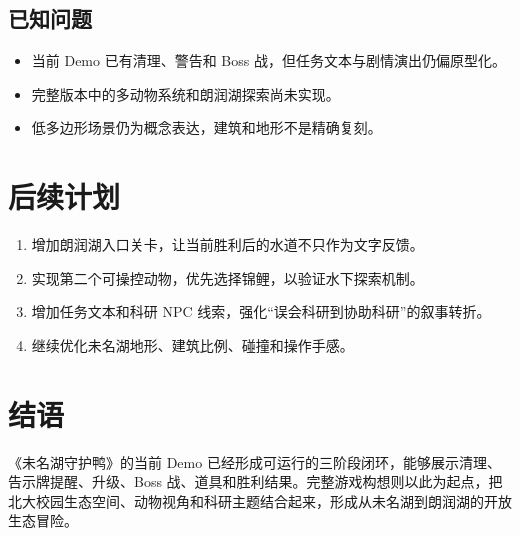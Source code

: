 \documentclass[UTF8,a4paper,12pt]{ctexart}
\begin{document}
\subsection{已知问题}

\begin{itemize}
  \item 当前 Demo 已有清理、警告和 Boss 战，但任务文本与剧情演出仍偏原型化。
  \item 完整版本中的多动物系统和朗润湖探索尚未实现。
  \item 低多边形场景仍为概念表达，建筑和地形不是精确复刻。
\end{itemize}

\section{后续计划}

\begin{enumerate}
  \item 增加朗润湖入口关卡，让当前胜利后的水道不只作为文字反馈。
  \item 实现第二个可操控动物，优先选择锦鲤，以验证水下探索机制。
  \item 增加任务文本和科研 NPC 线索，强化``误会科研到协助科研''的叙事转折。
  \item 继续优化未名湖地形、建筑比例、碰撞和操作手感。
\end{enumerate}

\section{结语}

《未名湖守护鸭》的当前 Demo 已经形成可运行的三阶段闭环，能够展示清理、告示牌提醒、升级、Boss 战、道具和胜利结果。完整游戏构想则以此为起点，把北大校园生态空间、动物视角和科研主题结合起来，形成从未名湖到朗润湖的开放生态冒险。
\end{document}
